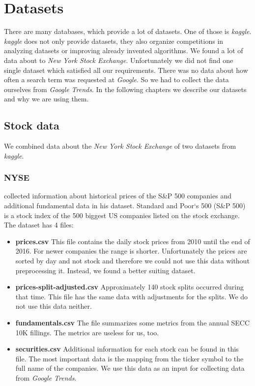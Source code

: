 \section{Datasets}
\label{sec:datasets}
There are many databases, which provide a lot of datasets. One of those is \textit{kaggle}. \textit{kaggle} does not only provide datasets, they also organize competitions in analyzing datasets or improving already invented algorithms. We found a lot of data about to \textit{New York Stock Exchange}. Unfortunately we did not find one single dataset which satisfied all our requirements. There was no data about how often a search term was requested at \textit{Google}. So we had to collect the data ourselves from \textit{Google Trends}. In the following chapters we describe our datasets and why we are using them.

\subsection{Stock data}
We combined data about the \textit{New York Stock Exchange} of two datasets from \textit{kaggle}.
\label{subsec:stockdata}

\subsubsection{NYSE}
\label{subsub:nyse}
\cite{NYSE} collected information about historical prices of the S\&P 500 companies and additional fundamental data in his dataset. Standard and Poor`s 500 (S\&P 500) is a stock index of the 500 biggest US companies listed on the stock exchange.\\
The dataset has 4 files:
\begin{itemize}
	\item \textbf{prices.csv} This file contains the daily stock prices from 2010 until the end of 2016. For newer companies the range is shorter. Unfortunately the prices are sorted by day and not stock and therefore we could not use this data without preprocessing it. Instead, we found a better suiting dataset.
	\item \textbf{prices-split-adjusted.csv} Approximately 140 stock splits occurred during that time. This file has the same data with adjustments for the splits. We do not use this data neither.
	\item \textbf{fundamentals.csv} The file summarizes some metrics from the annual SECC 10K fillings. The metrics are useless for us, too.
	\item \textbf{securities.csv} Additional information for each stock can be found in this file. The most important data is the mapping from the ticker symbol to the full name of the companies. We use this data as an input for collecting data from \textit{Google Trends}.
\end{itemize}


